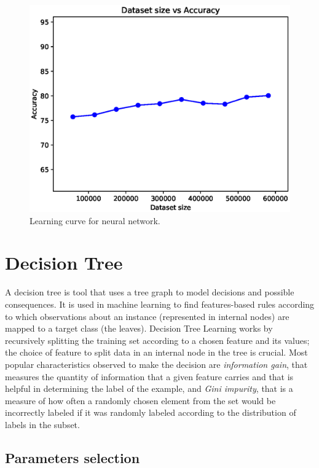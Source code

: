 \documentclass[a4paper, 10pt]{article}
\begin{document}
\begin{figure}[H]
 \centering
 \includegraphics[width=0.8\linewidth]{pictures/nn_size_vs_accuracy.eps}
 \caption{Learning curve for neural network.}
 \label{fig:nn_learning}
\end{figure}

\section{Decision Tree}

A decision tree is tool that uses a tree graph to model decisions and possible consequences. It is used in machine learning to find features-based rules according to which observations about an instance (represented in internal nodes) are mapped to a target class (the leaves). Decision Tree Learning works by recursively splitting the training set according to a chosen feature and its values; the choice of feature to split data in an internal node in the tree is crucial. Most popular characteristics observed to make the decision are \emph{information gain}, that measures the quantity of information that a given feature carries and that is helpful in determining the label of the example, and \emph{Gini impurity}, that is a measure of how often a randomly chosen element from the set would be incorrectly labeled if it was randomly labeled according to the distribution of labels in the subset.

\subsection{Parameters selection}
\end{document}
